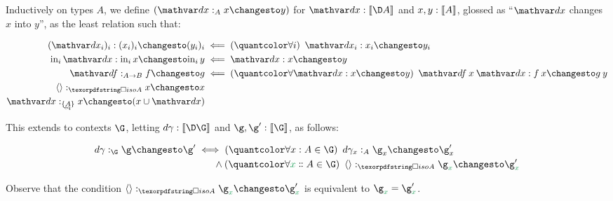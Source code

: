 \begin{definition} \label{def:changes}
  Inductively on types $A$, we define $(\changesat{A}{\dx}{x}{y})$ for $\dx :
  \den{\D A}$ and $x,y : \llbracket{A}\rrbracket$, glossed as ``$\dx$ changes $x$ into $y$'', as
  the least relation such that:

  \begin{align*}
    \changes{(\dx_i)_i}{(x_i)_i}{(y_i)_i}
    &\impliedby \fa{i} \changes{\dx_i}{x_i}{y_i}
    \\
    \changes{\inj i \dx}{\inj i x}{\inj i y}
    &\impliedby \changes{\dx}{x}{y}
    \\
    \changesat{A \to B}{\df}{f}{g}
    &\impliedby \fa{\changes\dx x y} \changes{\df\<x\<\dx}{f\<x}{g\<y}
    \\
    \changesat{\isof A}{\tuple{}}{x}{x}\\
    \changesat{\tseteq A}{\dx}{x}{(x \cup \dx)}
  \end{align*}

  \noindent This extends to contexts $\G$, letting $\dgamma : \den{\D\G}$ and
  $\g,\g' : \den{\G}$, as follows:

  \begin{align*}
    \changesat{\G}{\dgamma}{\g}{\g'}
    &\iff \fa{\h x A \in \G} \changesat{A}{\dgamma_x}{\g_x}{\g'_x}
    \\
    &\hspace*{1.8em}\wedge
    \fa{\hd x A \in \G}
    \changesat{\isof A}{\tuple{}}{\g_{\dvar x}}{\g'_{\dvar x}}
  \end{align*}

  \noindent Observe that the condition $\changesat{\isof A}{\tuple{}}{\g_{\dvar
      x}}{\g'_{\dvar x}}$ is equivalent to $\g_{\dvar x} = \g'_{\dvar x}$.

\end{definition}

